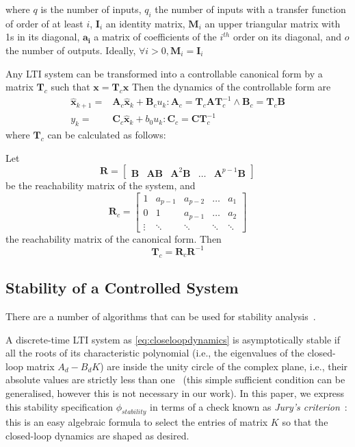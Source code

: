 \documentclass[sigconf]{llncs}
\newcommand{\mat}[1]{\boldsymbol{#1}}
\renewcommand{\vec}[1]{\boldsymbol{#1}}
\begin{document}
where $q$ is the number of inputs, $q_i$ the number of inputs with a transfer function of order of at least $i$, $\mat{I}_i$ an identity matrix, $\mat{M}_i$ an upper triangular matrix with 1s in its diagonal, $\mat{a_i}$ a matrix of coefficients of the $i^{th}$ order on its diagonal, and $o$ the number of outputs. Ideally, $\forall i>0, \mat{M}_i=\mat{I}_i$

Any LTI system can be transformed into a controllable canonical form by a matrix $\mat{T}_c$ such that $\vec{x}=\mat{T}_c\hat{\vec{x}}$
Then the dynamics of the controllable form are
\begin{align}
\hat{\vec{x}}_{k+1}=&\mat{A}_c\hat{\vec{x}}_k+\mat{B}_cu_k : \mat{A}_c=\mat{T}_c\mat{A}\mat{T}_c^{-1} \wedge \mat{B}_c=\mat{T}_c\mat{B}\\
y_k=&\mat{C}_c\hat{\vec{x}}_k + b_0u_k : \mat{C}_c=\mat{C}\mat{T}_c^{-1}\nonumber
\end{align}
where $\mat{T}_c$ can be calculated as follows:

Let 
\begin{equation}
\mat{R}=[\begin{array}{ccccc}\mat{B}&\mat{A}\mat{B}&\mat{A}^2\mat{B}&\hdots&\mat{A}^{p-1}\mat{B}\end{array}]
\label{eq:rncf}
\end{equation}
be the reachability matrix of the system, and
\begin{equation}
\mat{R}_{c}=\left[\begin{array}{ccccc}1&a_{p-1}&a_{p-2}&\hdots&a_1\\0&1&a_{p-1}&\hdots&a_2\\ \vdots&\ddots&\ddots&\ddots&\ddots\end{array}\right]
\label{eq:rcf}
\end{equation}
the reachability matrix of the canonical form. Then 
\begin{equation}
\mat{T}_c=\mat{R}_{c}\mat{R}^{-1}
\label{eq:to_cf}
\end{equation}

\subsection{Stability of a Controlled System} 
\label{sec:closed_stability}

There are a number of algorithms that can be
used for stability analysis~\cite{daes20161,Bessa16}.

A discrete-time LTI system as \eqref{eq:closeloopdynamics} is
asymptotically stable if all the roots of its characteristic
polynomial (i.e., the eigenvalues of the closed-loop matrix $A_d - B_d
K$) are inside the unity circle of the complex plane, i.e., their
absolute values are strictly less than one~\cite{astrom1997computer}
(this simple sufficient condition can be generalised, however this is
not necessary in our work).  In this paper, we express this stability
specification $\phi_\mathit{stability}$ in terms of a check known as
\emph{Jury's criterion}~\cite{fadali}: this is an easy algebraic
formula to select the entries of matrix $K$ so that the closed-loop
dynamics are shaped as desired.
\end{document}

